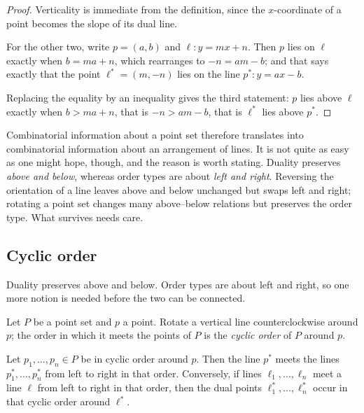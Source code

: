\begin{proof}
Verticality is immediate from the definition, since the $x$-coordinate of a
point becomes the slope of its dual line.

For the other two, write $p = (a,b)$ and $\ell : y = mx + n$. Then $p$ lies on
$\ell$ exactly when $b = ma + n$, which rearranges to $-n = am - b$; and that
says exactly that the point $\ell^{*} = (m,-n)$ lies on the line
$p^{*} : y = ax - b$.

Replacing the equality by an inequality gives the third statement: $p$ lies
above $\ell$ exactly when $b > ma+n$, that is $-n > am - b$, that is $\ell^{*}$
lies above $p^{*}$.
\end{proof}

Combinatorial information about a point set therefore translates into
combinatorial information about an arrangement of lines. It is not quite as
easy as one might hope, though, and the reason is worth stating. Duality
preserves \emph{above and below}, whereas order types are about \emph{left and
right}. Reversing the orientation of a line leaves above and below unchanged
but swaps left and right; rotating a point set changes many above--below
relations but preserves the order type. What survives needs care.

\subsection{Cyclic order}
\label{sec:cyclic-orders}

Duality preserves above and below. Order types are about left and right, so one
more notion is needed before the two can be connected.

\begin{definition}
Let $P$ be a point set and $p$ a point. Rotate a vertical line
counterclockwise around $p$; the order in which it meets the points of $P$ is
the \emph{cyclic order} of $P$ around $p$.
\end{definition}

\begin{lemma}\label{lem:er-cyclic-order}
Let $p_1, \ldots, p_n \in P$ be in cyclic order around $p$. Then the line
$p^{*}$ meets the lines $p_1^{*}, \ldots, p_n^{*}$ from left to right in that
order. Conversely, if lines $\ell_1, \ldots, \ell_n$ meet a line $\ell$ from
left to right in that order, then the dual points
$\ell_1^{*}, \ldots, \ell_n^{*}$ occur in that cyclic order around
$\ell^{*}$.
\end{lemma}

